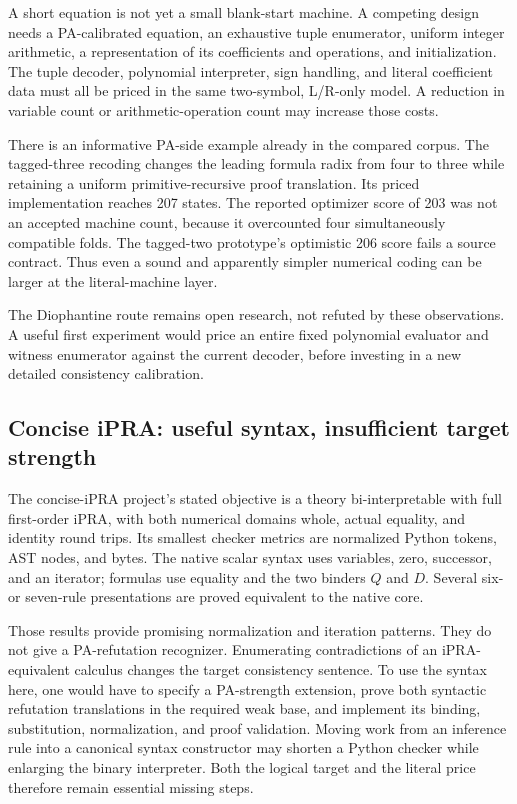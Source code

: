 \documentclass[11pt]{article}
\newcommand{\IPRA}{\mathrm{iPRA}}
\begin{document}
A short equation is not yet a small blank-start machine.  A competing
design needs a PA-calibrated equation, an exhaustive tuple enumerator,
uniform integer arithmetic, a representation of its coefficients and
operations, and initialization.  The tuple decoder, polynomial
interpreter, sign handling, and literal coefficient data must all be
priced in the same two-symbol, L/R-only model.  A reduction in variable
count or arithmetic-operation count may increase those costs.

There is an informative PA-side example already in the compared
corpus.  The tagged-three recoding changes the leading formula radix
from four to three while retaining a uniform primitive-recursive
proof translation.  Its priced implementation reaches 207 states.
The reported optimizer score of 203 was not an accepted machine count,
because it overcounted four simultaneously compatible folds.  The
tagged-two prototype's optimistic 206 score fails a source contract.
Thus even a sound and apparently simpler numerical coding can be
larger at the literal-machine layer.\cite{tagged}

The Diophantine route remains open research, not refuted by these
observations.  A useful first experiment would price an entire fixed
polynomial evaluator and witness enumerator against the current
decoder, before investing in a new detailed consistency calibration.

\subsection{Concise iPRA: useful syntax, insufficient target strength}

The concise-iPRA project's stated objective is a theory bi-interpretable
with full first-order \(\IPRA\), with both numerical domains whole,
actual equality, and identity round trips.  Its smallest checker
metrics are normalized Python tokens, AST nodes, and bytes.  The native
scalar syntax uses variables, zero, successor, and an iterator;
formulas use equality and the two binders \(Q\) and \(D\).  Several
six- or seven-rule presentations are proved equivalent to the native
core.\cite{concise}

Those results provide promising normalization and iteration patterns.
They do not give a PA-refutation recognizer.  Enumerating contradictions
of an iPRA-equivalent calculus changes the target consistency sentence.
To use the syntax here, one would have to specify a PA-strength
extension, prove both syntactic refutation translations in the required
weak base, and implement its binding, substitution, normalization, and
proof validation.  Moving work from an inference rule into a canonical
syntax constructor may shorten a Python checker while enlarging the
binary interpreter.  Both the logical target and the literal price
therefore remain essential missing steps.
\end{document}
